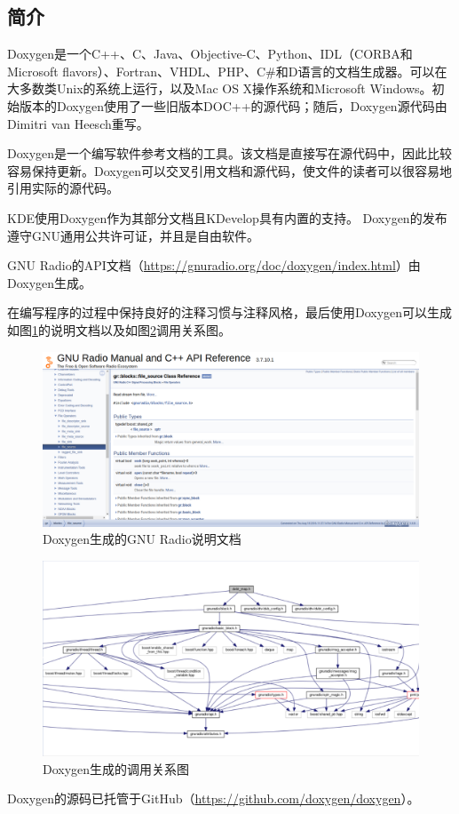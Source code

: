 		\subsection{简介}
			\par Doxygen是一个C++、C、Java、Objective-C、Python、IDL（CORBA和Microsoft flavors）、Fortran、VHDL、PHP、C\#和D语言的文档生成器。可以在大多数类Unix的系统上运行，以及Mac OS X操作系统和Microsoft Windows。初始版本的Doxygen使用了一些旧版本DOC++的源代码；随后，Doxygen源代码由Dimitri van Heesch重写。
			\par Doxygen是一个编写软件参考文档的工具。该文档是直接写在源代码中，因此比较容易保持更新。Doxygen可以交叉引用文档和源代码，使文件的读者可以很容易地引用实际的源代码。
			\par KDE使用Doxygen作为其部分文档且KDevelop具有内置的支持。 Doxygen的发布遵守GNU通用公共许可证，并且是自由软件。\cite{ wiki:Doxygen}
			\par GNU Radio的API文档（\href{https://gnuradio.org/doc/doxygen/index.html}{https://gnuradio.org/doc/doxygen/index.html}）由Doxygen生成。
			\par 在编写程序的过程中保持良好的注释习惯与注释风格，最后使用Doxygen可以生成如图\ref{fig:doxygen_gnuradio}的说明文档以及如图\ref{fig:doxygen_dvbt_map}调用关系图。
			\begin{figure}[htb]
				\centering
				\includegraphics[width=13cm]{figures/doxygen_gnuradio.png}
				\caption{Doxygen生成的GNU Radio说明文档}
				\label{fig:doxygen_gnuradio}
			\end{figure}
			\begin{figure}[htb]
				\centering
				\includegraphics[width=13cm]{figures/doxygen_dvbt_map.png}
				\caption{Doxygen生成的调用关系图}
				\label{fig:doxygen_dvbt_map}
			\end{figure}
			\par Doxygen的源码已托管于GitHub（\href{https://github.com/doxygen/doxygen}{https://github.com/doxygen/doxygen}）。
